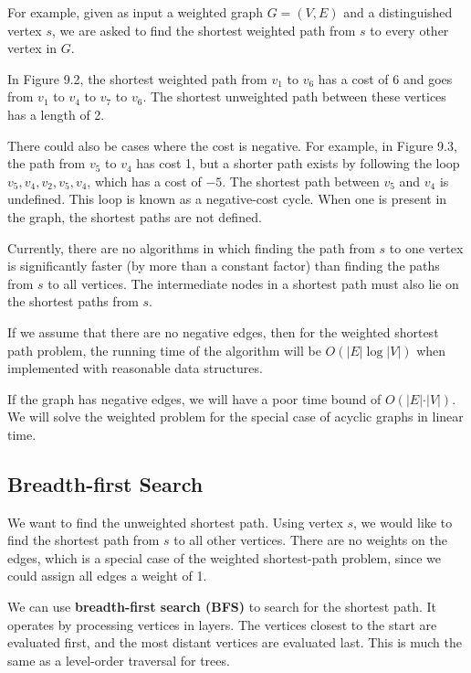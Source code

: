 For example, given as input a weighted graph \(G = (V, E)\) and a distinguished vertex \(s\), we are asked to find the shortest weighted path from \(s\) to every other vertex in \(G\).

In Figure 9.2, the shortest weighted path from \(v_1\) to \(v_6\) has a cost of 6 and goes from \(v_1\) to \(v_4\) to \(v_7\) to \(v_6\). The shortest unweighted path between these vertices has a length of 2. 

There could also be cases where the cost is negative. For example, in Figure 9.3, the path from \(v_5\) to \(v_4\) has cost 1, but a shorter path exists by following the loop \(v_5, v_4, v_2, v_5, v_4\), which has a cost of \(-5\). The shortest path between \(v_5\) and \(v_4\) is undefined. This loop is known as a negative-cost cycle. When one is present in the graph, the shortest paths are not defined.

Currently, there are no algorithms in which finding the path from \(s\) to one vertex is significantly faster (by more than a constant factor) than finding the paths from \(s\) to all vertices. The intermediate nodes in a shortest path must also lie on the shortest paths from \(s\).

If we assume that there are no negative edges, then for the weighted shortest path problem, the running time of the algorithm will be \(O(\vert E \vert \log \vert V \vert)\) when implemented with reasonable data structures.

If the graph has negative edges, we will have a poor time bound of \(O(\vert E \vert \cdot \vert V \vert)\). We will solve the weighted problem for the special case of acyclic graphs in linear time.

\subsection{Breadth-first Search}
We want to find the unweighted shortest path. Using vertex \(s\), we would like to find the shortest path from \(s\) to all other vertices. There are no weights on the edges, which is a special case of the weighted shortest-path problem, since we could assign all edges a weight of 1. 

We can use \textbf{breadth-first search (BFS)} to search for the shortest path. It operates by processing vertices in layers. The vertices closest to the start are evaluated first, and the most distant vertices are evaluated last. This is much the same as a level-order traversal for trees.



